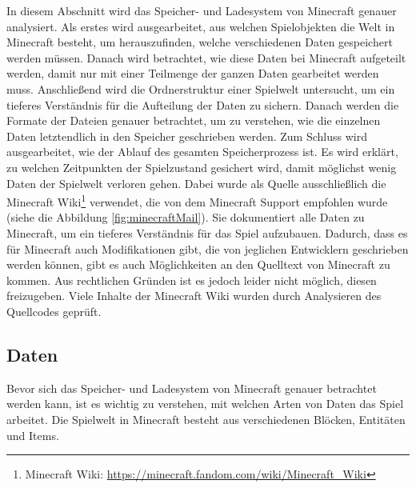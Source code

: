 In diesem Abschnitt wird das Speicher- und Ladesystem von Minecraft genauer analysiert. Als erstes wird ausgearbeitet, aus welchen Spielobjekten die Welt in Minecraft besteht, um herauszufinden, welche verschiedenen Daten gespeichert werden müssen. Danach wird betrachtet, wie diese Daten bei Minecraft aufgeteilt werden, damit nur mit einer Teilmenge der ganzen Daten gearbeitet werden muss. Anschließend wird die Ordnerstruktur einer Spielwelt untersucht, um ein tieferes Verständnis für die Aufteilung der Daten zu sichern. Danach werden die Formate der Dateien genauer betrachtet, um zu verstehen, wie die einzelnen Daten letztendlich in den Speicher geschrieben werden. Zum Schluss wird ausgearbeitet, wie der Ablauf des gesamten Speicherprozess ist. Es wird erklärt, zu welchen Zeitpunkten der Spielzustand gesichert wird, damit möglichst wenig Daten der Spielwelt verloren gehen. Dabei wurde als Quelle ausschließlich die Minecraft Wiki\footnote{ Minecraft Wiki: \url{https://minecraft.fandom.com/wiki/Minecraft_Wiki}} verwendet, die von dem Minecraft Support empfohlen wurde (siehe die Abbildung \ref{fig:minecraftMail}). Sie dokumentiert alle Daten zu Minecraft, um ein tieferes Verständnis für das Spiel aufzubauen. Dadurch, dass es für Minecraft auch Modifikationen gibt, die von jeglichen Entwicklern geschrieben werden können, gibt es auch Möglichkeiten an den Quelltext von Minecraft zu kommen. Aus rechtlichen Gründen ist es jedoch leider nicht möglich, diesen freizugeben. Viele Inhalte der Minecraft Wiki wurden durch Analysieren des Quellcodes geprüft.



\subsection{Daten}
Bevor sich das Speicher- und Ladesystem von Minecraft genauer betrachtet werden kann, ist es wichtig zu verstehen, mit welchen Arten von Daten das Spiel arbeitet. Die Spielwelt in Minecraft besteht aus verschiedenen Blöcken, Entitäten und Items. 

